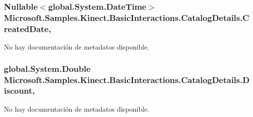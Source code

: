 \hypertarget{class_microsoft_1_1_samples_1_1_kinect_1_1_basic_interactions_1_1_catalog_details_aa31ad165f7238ec2c47da48bb5f9d454}{
\subsubsection[{Created\-Date}]{\setlength{\rightskip}{0pt plus 5cm}Nullable$<$global.\-System.\-Date\-Time$>$ Microsoft.\-Samples.\-Kinect.\-Basic\-Interactions.\-Catalog\-Details.\-Created\-Date\hspace{0.3cm}{\ttfamily [get]}, {\ttfamily [set]}}}\label{class_microsoft_1_1_samples_1_1_kinect_1_1_basic_interactions_1_1_catalog_details_aa31ad165f7238ec2c47da48bb5f9d454}


No hay documentación de metadatos disponible. 

\hypertarget{class_microsoft_1_1_samples_1_1_kinect_1_1_basic_interactions_1_1_catalog_details_a5936329a5955b2d22eee48f9f7bfea39}{
\subsubsection[{Discount}]{\setlength{\rightskip}{0pt plus 5cm}global.\-System.\-Double Microsoft.\-Samples.\-Kinect.\-Basic\-Interactions.\-Catalog\-Details.\-Discount\hspace{0.3cm}{\ttfamily [get]}, {\ttfamily [set]}}}\label{class_microsoft_1_1_samples_1_1_kinect_1_1_basic_interactions_1_1_catalog_details_a5936329a5955b2d22eee48f9f7bfea39}


No hay documentación de metadatos disponible. 

